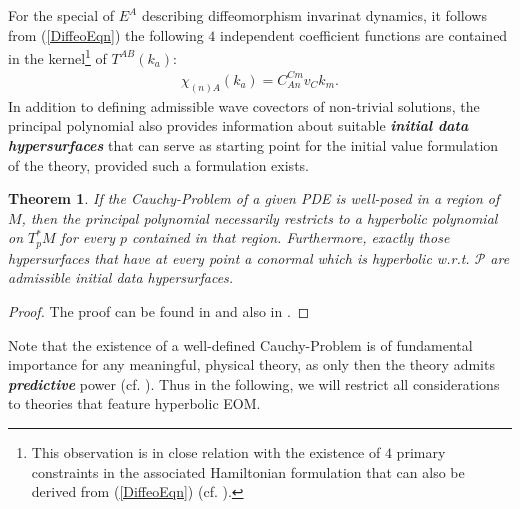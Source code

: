 \documentclass[%
 reprint,
nofootinbib,
 amsmath,amssymb,
 aps,
 prd,
floatfix,
]{revtex4-2}
\newtheorem{theorem}{Theorem}
\begin{document}
For the special of $E^A$ describing diffeomorphism invarinat dynamics, it follows from (\ref{DiffeoEqn}) the following $4$ independent coefficient functions are contained in the kernel\footnote{This observation is in close relation with the existence of $4$ primary constraints in the associated Hamiltonian formulation that can also be derived from (\ref{DiffeoEqn}) (cf. \cite{TobiMaster}).}  of $T^{AB}(k_a)$: 
\begin{align}
   \chi_{(n)A}(k_a) =  C_{An}^{Cm}v_Ck_m.
\end{align}
In addition to defining admissible wave covectors of non-trivial solutions, the principal polynomial also provides information about suitable \textit{\textbf{initial data hypersurfaces}} that can serve as starting point for the initial value formulation of the theory, provided such a formulation exists.
\begin{theorem}
If the Cauchy-Problem of a given PDE is well-posed in a region of $M$, then the principal polynomial necessarily restricts to a hyperbolic polynomial on $T_p^{\ast}M$ for every $p$ contained in that region. Furthermore, exactly those hypersurfaces that have at every point a conormal which is hyperbolic w.r.t. $\mathcal{P}$ are admissible initial data hypersurfaces.
\end{theorem}
\begin{proof}
The proof can be found in \cite{Hormander1977} and also in \cite{Ivrii_1974}.
\end{proof}
Note that the existence of a well-defined Cauchy-Problem is of fundamental importance for any meaningful, physical theory, as only then the theory admits \textit{\textbf{predictive}} power (cf. \cite{Rivera}).  Thus in the following, we will restrict all considerations to theories that feature hyperbolic EOM.
\end{document}
